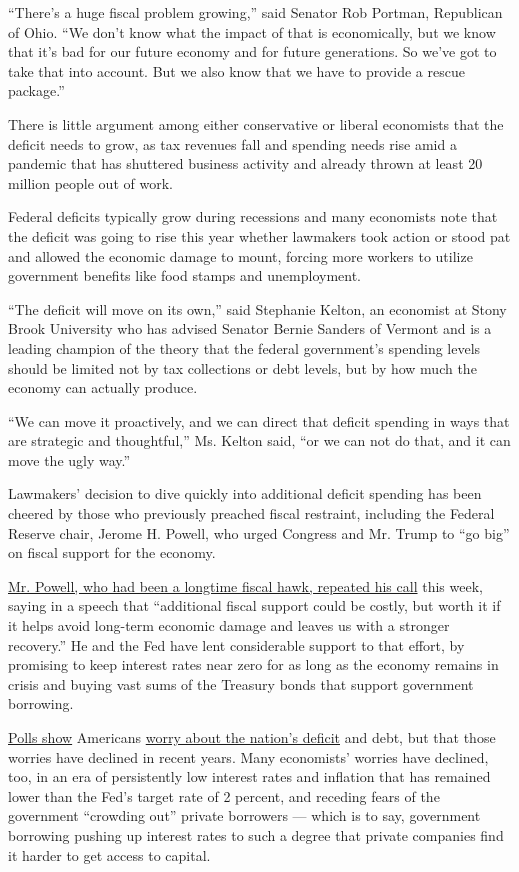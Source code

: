 ``There's a huge fiscal problem growing,'' said Senator Rob Portman,
Republican of Ohio. ``We don't know what the impact of that is
economically, but we know that it's bad for our future economy and for
future generations. So we've got to take that into account. But we also
know that we have to provide a rescue package.''

There is little argument among either conservative or liberal economists
that the deficit needs to grow, as tax revenues fall and spending needs
rise amid a pandemic that has shuttered business activity and already
thrown at least 20 million people out of work.

Federal deficits typically grow during recessions and many economists
note that the deficit was going to rise this year whether lawmakers took
action or stood pat and allowed the economic damage to mount, forcing
more workers to utilize government benefits like food stamps and
unemployment.

``The deficit will move on its own,'' said Stephanie Kelton, an
economist at Stony Brook University who has advised Senator Bernie
Sanders of Vermont and is a leading champion of the theory that the
federal government's spending levels should be limited not by tax
collections or debt levels, but by how much the economy can actually
produce.

``We can move it proactively, and we can direct that deficit spending in
ways that are strategic and thoughtful,'' Ms. Kelton said, ``or we can
not do that, and it can move the ugly way.''

Lawmakers' decision to dive quickly into additional deficit spending has
been cheered by those who previously preached fiscal restraint,
including the Federal Reserve chair, Jerome H. Powell, who urged
Congress and Mr. Trump to ``go big'' on fiscal support for the economy.

\href{https://www.federalreserve.gov/newsevents/speech/powell20200513a.htm}{Mr.
Powell, who had been a longtime fiscal hawk, repeated his call} this
week, saying in a speech that ``additional fiscal support could be
costly, but worth it if it helps avoid long-term economic damage and
leaves us with a stronger recovery.'' He and the Fed have lent
considerable support to that effort, by promising to keep interest rates
near zero for as long as the economy remains in crisis and buying vast
sums of the Treasury bonds that support government borrowing.

\href{https://news.gallup.com/poll/147626/federal-budget-deficit.aspx}{Polls
show} Americans
\href{https://www.people-press.org/2019/12/17/views-of-the-major-problems-facing-the-country/}{worry
about the nation's deficit} and debt, but that those worries have
declined in recent years. Many economists' worries have declined, too,
in an era of persistently low interest rates and inflation that has
remained lower than the Fed's target rate of 2 percent, and receding
fears of the government ``crowding out'' private borrowers --- which is
to say, government borrowing pushing up interest rates to such a degree
that private companies find it harder to get access to capital.

